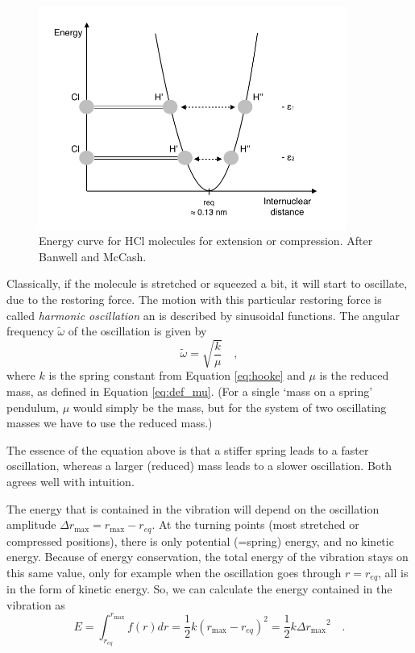 \begin{figure}
\begin{center}
\includegraphics[width=0.9\textwidth]{figures/Vibration_parabol}
\caption{Energy curve for HCl molecules for extension or compression. After Banwell and McCash.}
\label{Vibration_parabol}
\end{center}
\end{figure}

Classically, if the molecule is stretched or squeezed a bit, it will
start to oscillate, due to the restoring force. The motion with this
particular restoring force is called \emph{harmonic oscillation} an is
described by sinusoidal functions. The angular frequency $\tilde{\omega}$ of the
oscillation is given by
\begin{equation}
\tilde{\omega} = \sqrt{\frac{k}{\mu}} \quad ,
\end{equation}
where $k$ is the spring constant from Equation \ref{eq:hooke} and
$\mu$ is the reduced mass, as defined in Equation
\ref{eq:def_mu}. (For a single `mass on a spring' pendulum, $\mu$
would simply be the mass, but for the system of two oscillating masses
we have to use the reduced mass.)

The essence of the equation above is that a stiffer spring leads to a
faster oscillation, whereas a larger (reduced) mass leads to a slower
oscillation. Both agrees well with intuition.

The energy that is contained in the vibration will depend on the
oscillation amplitude $\Delta r_{\mathrm{max}} = r_{\mathrm{max}}-r_{eq}$. At
the turning points (most stretched or compressed positions), there is
only potential (=spring) energy, and no kinetic energy. Because of
energy conservation, the total energy of the vibration stays on this
same value, only for example when the oscillation goes through
$r=r_{eq}$, all is in the form of kinetic energy. So, we can calculate
the energy contained in the vibration as
\begin{equation}
E = \int_{r_{eq}}^{r_{\mathrm{max}}} f(r)dr = \frac{1}{2}k (r_{\mathrm{max}} - r_{eq})^2 = \frac{1}{2} k {\Delta r_{\mathrm{max}}}^2 \quad .
\end{equation}

